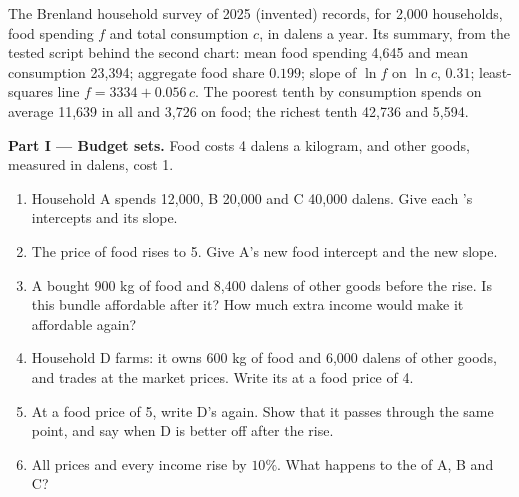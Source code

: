 \begin{problem}\label{pb:b1:consumer-choice:survey}
The Brenland household survey of 2025 (invented) records, for 2,000
households, food spending $f$ and total consumption $c$, in dalens a year.
Its summary, from the tested script behind the second chart: mean food
spending 4,645 and mean consumption 23,394; aggregate food share $0.199$;
slope of $\ln f$ on $\ln c$, $0.31$; least-squares line
$f = 3334 + 0.056\,c$. The poorest tenth by consumption spends on average
11,639 in all and 3,726 on food; the richest tenth 42,736 and
5,594. %

\medskip\noindent\textbf{Part I --- Budget sets.} Food costs 4 dalens a
kilogram, and other goods, measured in dalens, cost 1.
\begin{enumerate}
  \item Household A spends 12,000, B 20,000 and C 40,000 dalens. Give each 's intercepts and its slope.
  \item The price of food rises to 5. Give A's new food intercept and the new slope.
  \item A bought 900 kg of food and 8,400 dalens of other goods before the rise. Is this bundle affordable after it? How much extra income would make it affordable again?
  \item Household D farms: it owns 600 kg of food and 6,000 dalens of other goods, and trades at the market prices. Write its  at a food price of 4.
  \item At a food price of 5, write D's  again. Show that it passes through the same point, and say when D is better off after the rise.
  \item All prices and every income rise by $10\%$. What happens to the  of A, B and C?
\end{enumerate}


\end{problem}
